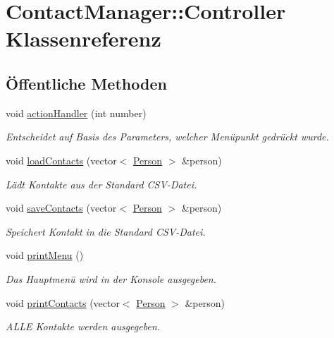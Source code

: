 \hypertarget{classContactManager_1_1Controller}{}\section{Contact\+Manager\+:\+:Controller Klassenreferenz}
\label{classContactManager_1_1Controller}
\subsection*{Öffentliche Methoden}
\begin{DoxyCompactItemize}
\item 
void \hyperlink{classContactManager_1_1Controller_afd2e274df3edef5ab0abf90aae5ad21c}{action\+Handler} (int number)
\begin{DoxyCompactList}\small\item\em Entscheidet auf Basis des Parameters, welcher Menüpunkt gedrückt wurde.\end{DoxyCompactList}\item 
void \hyperlink{classContactManager_1_1Controller_aa10f0286519a294d96077af9eaa7b98c}{load\+Contacts} (vector$<$ \hyperlink{classContactManager_1_1Person}{Person} $>$ \&person)
\begin{DoxyCompactList}\small\item\em Lädt Kontakte aus der Standard C\+S\+V-\/\+Datei.\end{DoxyCompactList}\item 
void \hyperlink{classContactManager_1_1Controller_a9e9c1932416993fd47fcf77601fa7974}{save\+Contacts} (vector$<$ \hyperlink{classContactManager_1_1Person}{Person} $>$ \&person)
\begin{DoxyCompactList}\small\item\em Speichert Kontakt in die Standard C\+S\+V-\/\+Datei.\end{DoxyCompactList}\item 
void \hyperlink{classContactManager_1_1Controller_ab36756f7c338b7f7d31fe74ad48f059d}{print\+Menu} ()
\begin{DoxyCompactList}\small\item\em Das Hauptmenü wird in der Konsole ausgegeben.\end{DoxyCompactList}\item 
void \hyperlink{classContactManager_1_1Controller_abd46b513b9d71e896fa3187e616aa805}{print\+Contacts} (vector$<$ \hyperlink{classContactManager_1_1Person}{Person} $>$ \&person)
\begin{DoxyCompactList}\small\item\em A\+L\+LE Kontakte werden ausgegeben.\end{DoxyCompactList}\item 

\end{DoxyCompactItemize}
